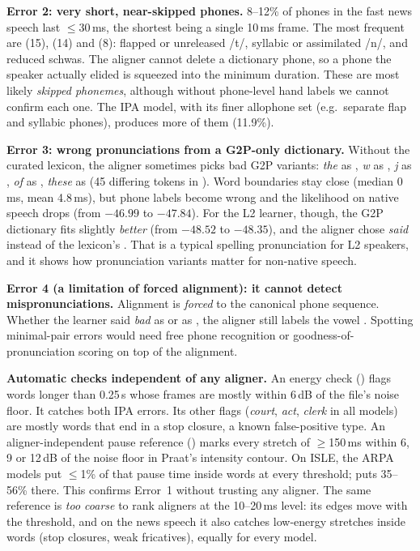 \textbf{Error 2: very short, near-skipped phones.} 8--12\% of phones in the fast news speech last $\le$30\,ms, the shortest being a single 10\,ms frame.
The most frequent are  (15),  (14) and  (8): flapped or unreleased /t/, syllabic or assimilated /n/, and reduced schwas.
The aligner cannot delete a dictionary phone, so a phone the speaker actually elided is squeezed into the minimum duration. These are most likely \emph{skipped phonemes}, although without phone-level hand labels we cannot confirm each one.
The IPA model, with its finer allophone set (e.g.\ separate flap and syllabic phones), produces more of them (11.9\%).

\textbf{Error 3: wrong pronunciations from a G2P-only dictionary.} Without the curated lexicon, the aligner sometimes picks bad G2P variants:
\textit{the} as , \textit{w} as , \textit{j} as , \textit{of} as , \textit{these} as  (45 differing tokens in ).
Word boundaries stay close (median 0\,ms, mean 4.8\,ms), but phone labels become wrong and the likelihood on native speech drops (from $-46.99$ to $-47.84$).
For the L2 learner, though, the G2P dictionary fits slightly \emph{better} (from $-48.52$ to $-48.35$), and the aligner chose \textit{said}~ instead of the lexicon's .
That is a typical spelling pronunciation for L2 speakers, and it shows how pronunciation variants matter for non-native speech.

\textbf{Error 4 (a limitation of forced alignment): it cannot detect mispronunciations.} Alignment is \emph{forced} to the canonical phone sequence.
Whether the learner said \textit{bad} as  or as , the aligner still labels the vowel .
Spotting minimal-pair errors would need free phone recognition or goodness-of-pronunciation scoring on top of the alignment.

\textbf{Automatic checks independent of any aligner.} An energy check () flags words longer than 0.25\,s whose frames are mostly within 6\,dB of the file's noise floor.
It catches both IPA errors. Its other flags (\textit{court}, \textit{act}, \textit{clerk} in all models) are mostly words that end in a stop closure, a known false-positive type.
An aligner-independent pause reference () marks every stretch of $\ge$150\,ms within 6, 9 or 12\,dB of the noise floor in Praat's intensity contour.
On ISLE, the ARPA models put $\le$1\% of that pause time inside words at every threshold;  puts 35--56\% there.
This confirms Error~1 without trusting any aligner. The same reference is \emph{too coarse} to rank aligners at the 10--20\,ms level: its edges move with the threshold, and on the news speech it also catches low-energy stretches inside words (stop closures, weak fricatives), equally for every model.

